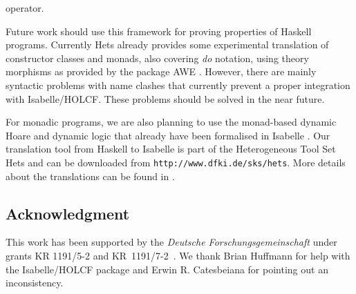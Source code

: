 \documentclass{llncs}
\begin{document}
operator.


Future work should use this framework for proving properties of
Haskell programs.  Currently Hets already provides some experimental
translation of constructor classes and monads, also covering \emph{do}
notation, using theory morphisms as provided by the package AWE
\cite{AWE}. However, there are mainly syntactic problems with name
clashes that currently prevent a proper integration with
Isabelle/HOLCF. These problems should be solved in the near future.

For monadic programs, we are also planning to use the monad-based
dynamic Hoare and dynamic logic that already have been formalised in
Isabelle \cite{Walter05}. Our translation tool from Haskell to
Isabelle is part of the Heterogeneous Tool Set Hets and can be
downloaded from \texttt{http://www.dfki.de/sks/hets}. More details
about the translations can be found in \cite{Tlmm}.



\subsection*{Acknowledgment}
This work has been supported by the {\em Deutsche
  Forschungsgemeinschaft} under grants KR \mbox{1191/5-2} and \mbox{KR
  1191/7-2 }. We thank Brian Huffmann for help with the Isabelle/HOLCF
package and Erwin R. Catesbeiana for pointing out an inconsistency.

 
\end{document}
